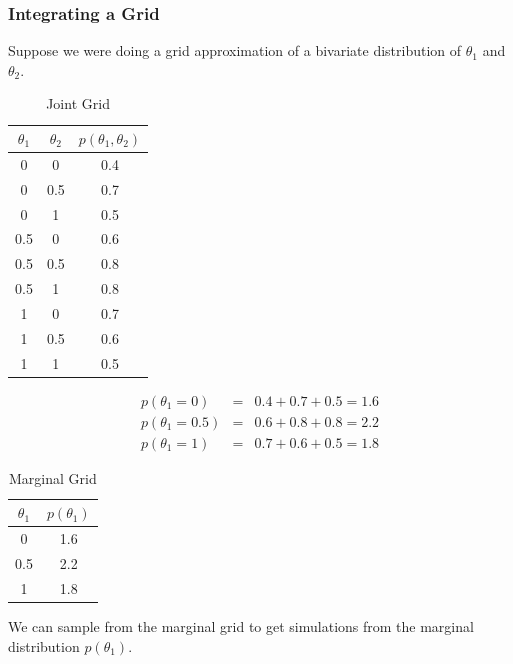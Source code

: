 \documentclass{beamer}
\begin{document}
\begin{frame}
\frametitle{Integrating a Grid}
\pause
Suppose we were doing a grid approximation of a bivariate distribution
of $\theta_1$ and $\theta_2$. \\
\begin{multicols}{2}
\pause
\scriptsize
\begin{table}[!htp]
\begin{center}
\caption{Joint Grid}
\begin{tabular}{|c|c|c|}
\hline
$\theta_1$ & $\theta_2$ & $p(\theta_1, \theta_2)$\\
\hline
0 & 0 & 0.4 \\
0 & 0.5 & 0.7\\
0 & 1 & 0.5\\
0.5 & 0 & 0.6\\
0.5 & 0.5 & 0.8\\
0.5 & 1 & 0.8\\
1 & 0 & 0.7\\
1 & 0.5 & 0.6\\
1 & 1 & 0.5\\
\hline
\end{tabular}
\end{center}
\end{table}
\pause
\begin{eqnarray*}
p(\theta_1 = 0) &=& 0.4 + 0.7 + 0.5 = 1.6\\
p(\theta_1 = 0.5) &=& 0.6+0.8+0.8 = 2.2\\
p(\theta_1 = 1) &=& 0.7+0.6+0.5 = 1.8
\end{eqnarray*}
\pause
\begin{table}[!htp]
\begin{center}
\caption{Marginal Grid}
\begin{tabular}{|c|c|}
\hline
$\theta_1$  & $p(\theta_1)$\\
\hline
0 & 1.6\\
0.5 & 2.2\\
1 & 1.8\\
\hline
\end{tabular}
\end{center}
\end{table}
\end{multicols}
\pause
\normalsize
We can sample from the marginal grid to get simulations from the
marginal distribution $p(\theta_1)$. 
\end{frame}
\end{document}
